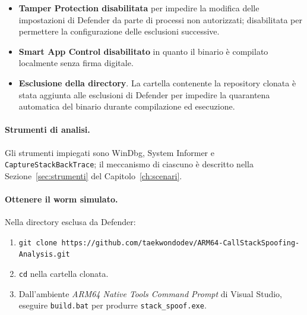 \begin{itemize}
  \item \textbf{Tamper Protection disabilitata} per impedire la modifica delle
        impostazioni di Defender da parte di processi non autorizzati; disabilitata
        per permettere la configurazione delle esclusioni successive.
  \item \textbf{Smart App Control disabilitato} in quanto il binario è compilato localmente senza firma digitale.
  \item \textbf{Esclusione della directory}. La cartella contenente la repository
        clonata è stata aggiunta alle esclusioni di Defender per impedire la
        quarantena automatica del binario durante compilazione ed esecuzione.
\end{itemize}

\paragraph{Strumenti di analisi.}
Gli strumenti impiegati sono WinDbg, System Informer
e \texttt{Capture\-Stack\-Back\-Trace}; il meccanismo di ciascuno
è descritto nella Sezione~\ref{sec:strumenti} del
Capitolo~\ref{ch:scenari}.

\paragraph{Ottenere il worm simulato.}
Nella directory esclusa da Defender:
\begin{enumerate}
  \item \texttt{git clone https://github.com/taekwondodev/ARM64-CallStackSpoofing-Analysis.git}
  \item \texttt{cd} nella cartella clonata.
  \item Dall'ambiente \emph{ARM64 Native Tools Command Prompt} di Visual
        Studio, eseguire \texttt{build.bat} per produrre
        \texttt{stack\_spoof.exe}.
\end{enumerate}
